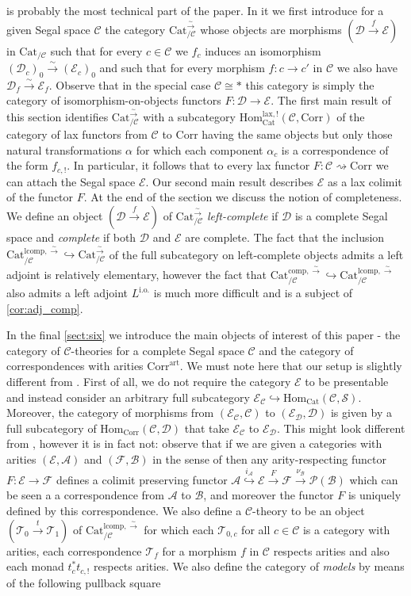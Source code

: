 \documentclass[a4paper, reqno]{amsart}
\theoremstyle{definition}
\newcommand\cA{\mathscr A}
\newcommand\cB{\mathscr B}
\newcommand\cC{\mathscr C}
\newcommand\cD{\mathscr D}
\newcommand\cE{\mathscr E}
\newcommand\cF{\mathscr F}
\newcommand\cP{\mathscr P}
\newcommand\cS{\mathscr S}
\newcommand\cT{\mathscr T}
\newcommand\art{\mathrm{art}}
\newcommand\mor{\mathrm{Hom}}
\newcommand\cat{\mathrm{Cat}}
\newcommand\comp{\mathrm{comp}}
\newcommand\lcomp{\mathrm{lcomp}}
\newcommand\corr{\mathrm{Corr}}
\newcommand\bo{\mathrm{i.o.}}
\newcommand\lax{\mathrm{lax}}
\newcommand\wrr{{\overset{\sim}{\rightarrow}}}
\begin{document}
 is probably the most technical part of the paper. In it we first introduce for a given Segal space $\cC$ the category $\cat^\wrr_{/\cC}$ whose objects are morphisms $(\cD\xrightarrow{f}\cE)$ in $\cat_{/\cC}$ such that for every $c\in\cC$ we $f_c$ induces an isomorphism $(\cD_c)_0\xrightarrow{\sim}(\cE_c)_0$ and such that for every morphism $f:c\rightarrow c'$ in $\cC$ we also have $\cD_f\xrightarrow{\sim}\cE_f$. Observe that in the special case $\cC\cong*$ this category is simply the category of isomorphism-on-objects functors $F:\cD\rightarrow\cE$. The first main result of this section identifies $\cat^\wrr_{/\cC}$ with a subcategory $\mor_\cat^{\lax,!}(\cC,\corr)$ of the category of lax functors from $\cC$ to $\corr$ having the same objects but only those natural transformations $\alpha$ for which each component $\alpha_c$ is a correspondence of the form $f_{c,!}$. In particular, it follows that to every lax functor $F:\cC\rightsquigarrow\corr$ we can attach the Segal space $\cE$. Our second main result describes $\cE$ as a lax colimit of the functor $F$. At the end of the section we discuss the notion of completeness. We define an object $(\cD\xrightarrow{f}\cE)$ of $\cat^\wrr_{/\cC}$ \textit{left-complete} if $\cD$ is a complete Segal space and \textit{complete} if both $\cD$ and $\cE$ are complete. The fact that the inclusion $\cat^{\lcomp,\wrr}_{/\cC}\hookrightarrow\cat^\wrr_{/\cC}$ of the full subcategory on left-complete objects admits a left adjoint is relatively elementary, however the fact that $\cat^{\comp,\wrr}_{/\cC}\hookrightarrow\cat^{\lcomp,\wrr}_{/\cC}$ also admits a left adjoint $L^\bo$ is much more difficult and is a subject of \cref{cor:adj_comp}.\par
In the final \cref{sect:six} we introduce the main objects of interest of this paper - the category of $\cC$-theories for a complete Segal space $\cC$ and the category of correspondences with arities $\corr^\art$. We must note here that our setup is slightly different from \cite{berger2012monads}. First of all, we do not require the category $\cE$ to be presentable and instead consider an arbitrary full subcategory $\cE_\cC\hookrightarrow\mor_\cat(\cC,\cS)$. Moreover, the category of morphisms from $(\cE_\cC,\cC)$ to $(\cE_\cD,\cD)$ is given by a full subcategory of $\mor_\corr(\cC,\cD)$ that take $\cE_\cC$ to $\cE_\cD$. This might look different from \cite{berger2012monads}, however it is in fact not: observe that if we are given a categories with arities $(\cE,\cA)$ and $(\cF,\cB)$ in the sense of \cite{berger2012monads} then any arity-respecting functor $F:\cE\rightarrow\cF$ defines a colimit preserving functor $\cA\overset{i_\cA}{\hookrightarrow}\cE\xrightarrow{F}\cF\xrightarrow{\nu_\cB}\cP(\cB)$ which can be seen a a correspondence from $\cA$ to $\cB$, and moreover the functor $F$ is uniquely defined by this correspondence. We also define a $\cC$-theory to be an object $(\cT_0\xrightarrow{t}\cT_1)$ of $\cat^{\lcomp,\wrr}_{/\cC}$ for which each $\cT_{0,c}$ for all $c\in\cC$ is a category with arities, each correspondence $\cT_f$ for a morphism $f$ in $\cC$ respects arities and also each monad $t^*_c t_{c,!}$ respects arities. We also define the category of \textit{models} by means of the following pullback square
\end{document}
